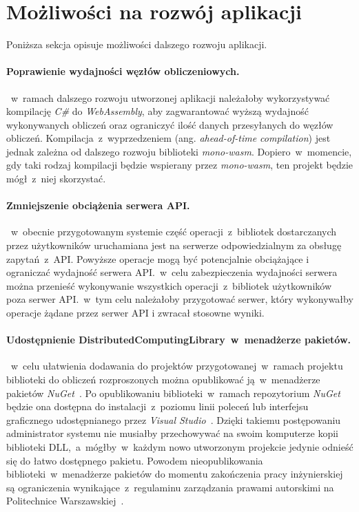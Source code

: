\documentclass[a4paper,11pt,twoside]{report}
\theoremstyle{definition}
\begin{document}
    \section{Możliwości na rozwój aplikacji}
        \label{mozliwosci-na-rozwoj-aplikacji}
        Poniższa sekcja opisuje możliwości dalszego rozwoju aplikacji.
    
        \paragraph{Poprawienie wydajności węzłów obliczeniowych.}
       ~w~ramach dalszego rozwoju utworzonej aplikacji należałoby wykorzystywać kompilację \textit{C\#} do \textit{WebAssembly}, aby zagwarantować wyższą wydajność wykonywanych obliczeń oraz ograniczyć ilość danych przesyłanych do węzłów obliczeń. Kompilacja~z~wyprzedzeniem (ang. \textit{ahead-of-time compilation}) jest jednak zależna od dalszego rozwoju biblioteki \textit{mono-wasm}. Dopiero~w~momencie, gdy taki rodzaj kompilacji będzie wspierany przez \textit{mono-wasm}, ten projekt będzie mógł~z~niej skorzystać.
        
        \paragraph{Zmniejszenie obciążenia serwera API.}
       ~w~obecnie przygotowanym systemie część operacji~z~bibliotek dostarczanych przez użytkowników uruchamiana jest na serwerze odpowiedzialnym za obsługę zapytań~z~API. Powyższe operacje mogą być potencjalnie obciążające i ograniczać wydajność serwera API.~w~celu zabezpieczenia wydajności serwera można przenieść wykonywanie wszystkich operacji~z~bibliotek użytkowników poza serwer API.~w~tym celu należałoby przygotować serwer, który wykonywałby operacje żądane przez serwer API i zwracał stosowne wyniki.
        
        \paragraph{Udostępnienie DistributedComputingLibrary~w~menadżerze pakietów.}
       ~w~celu ułatwienia dodawania do projektów przygotowanej~w~ramach projektu biblioteki do obliczeń rozproszonych można opublikować ją~w~menadżerze pakietów \textit{NuGet}~\cite{nuget}. Po opublikowaniu biblioteki~w~ramach repozytorium \textit{NuGet} będzie ona dostępna do instalacji~z~poziomu linii poleceń lub interfejsu graficznego udostępnianego przez \textit{Visual Studio}~\cite{visual-studio}.
        Dzięki takiemu postępowaniu administrator systemu nie musiałby przechowywać na swoim komputerze kopii biblioteki DLL,~a~mógłby~w~każdym nowo utworzonym projekcie jedynie odnieść się do łatwo dostępnego pakietu.
        Powodem nieopublikowania biblioteki~w~menadżerze pakietów do momentu zakończenia pracy inżynierskiej są ograniczenia wynikające~z~regulaminu zarządzania prawami autorskimi na Politechnice Warszawskiej~\cite{uchwala-prawa-autorskie}.
        
\end{document}
